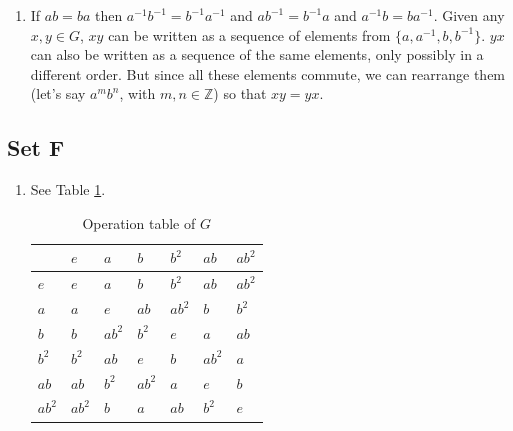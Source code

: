 \documentclass{article}
\begin{document}
\begin{enumerate}
    \item If $ab = ba$ then $a^{-1}b^{-1} = b^{-1}a^{-1}$ and $ab^{-1} = b^{-1}a$ and $a^{-1}b = ba^{-1}$. Given any $x, y \in G$, $xy$ can be written as a sequence of elements from $\{a, a^{-1}, b, b^{-1}\}$. $yx$ can also be written as a sequence of the same elements, only possibly in a different order. But since all these elements commute, we can rearrange them (let's say $a^mb^n$, with $m, n \in \mathbb{Z}$) so that $xy = yx$.
\end{enumerate}

\subsection{Set F}
\begin{enumerate}
    \item See Table \ref{tab:op-generated}.
        \begin{table}[H]
            \centering
            \begin{tabular}{l|llllll}
                &$e$   &$a$   &$b$   &$b^2$ &$ab$  &$ab^2$\\ \hline
            $e$    &$e$   &$a$   &$b$   &$b^2$ &$ab$  &$ab^2$\\
            $a$    &$a$   &$e$   &$ab$  &$ab^2$&$b$   &$b^2$ \\
            $b$    &$b$   &$ab^2$&$b^2$ &$e$   &$a$   &$ab$  \\
            $b^2$  &$b^2$ &$ab$  &$e$   &$b$   &$ab^2$&$a$   \\
            $ab$   &$ab$  &$b^2$ &$ab^2$&$a$   &$e$   &$b$   \\
            $ab^2$ &$ab^2$&$b$   &$a$   &$ab$  &$b^2$ &$e$  
            \end{tabular}
            \caption{Operation table of $G$}
            \label{tab:op-generated}
        \end{table}


\end{enumerate}
\end{document}
